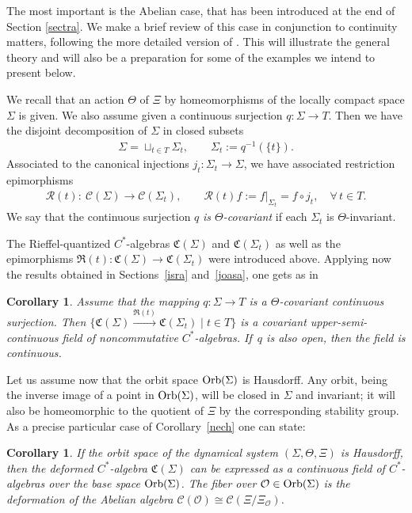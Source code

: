 \documentclass[pdftex]{sigma}
\def\Th{\Theta}
\def\C{\mathcal{C}}
\def\R{\mathcal{R}}
\def\CC{{\mathfrak C}}
\def\RR{{\mathfrak R}}
\def\Si{\Sigma}
\providecommand{\CC}{\mathfrak{C}}
\newtheorem{Corollary}[Theorem]{Corollary}
\begin{document}
The most important is the Abelian case, that has been introduced at the end of Section \ref{sectra}.
We make a brief review of this case in conjunction to continuity matters, following the more detailed version of \cite[Section~2]{BM}. This will illustrate the general theory and will also be a preparation for some of the examples we intend to present below.

We recall that an action $\Th$ of $\Xi$ by homeomorphisms of the locally compact space $\Si$ is given. We also assume given a continuous surjection $q:\Sigma\to T$. Then we have the disjoint decomposition of $\Si$ in closed subsets
\begin{gather*}%
\Si=\sqcup_{t\in T}\Si_t,\qquad \Si_t:=q^{-1}(\{t\}).
\end{gather*}
Associated to the canonical injections $j_t:\Si_t\to\Si$, we have associated restriction epimorphisms
\begin{gather*}%
\R(t): \ \C(\Si)\to\C(\Si_t),\qquad \R(t)f:=f|_{\Si_t}=f\circ j_t,\quad \forall\, t\in T.
\end{gather*}
We say that the continuous surjection $q$ {\it is $\Th$-covariant} if each $\Si_t$ is $\Theta$-invariant.

The Rief\/fel-quantized $C^*$-algebras $\CC(\Si)$ and $\CC(\Si_t)$ as well as the epimorphisms
$\mathfrak R(t):\CC(\Si)\rightarrow\CC(\Si_t)$ were introduced above.
Applying now the results obtained in Sections~\ref{isra} and~\ref{joasa}, one gets as in \cite[Section~2]{BM}

\begin{Corollary}\label{cfild}
Assume that the mapping $q:\Si\rightarrow T$ is a $\Th$-covariant continuous surjection.
Then $\big\{\CC(\Si)\overset{\RR(t)}{\longrightarrow}\CC(\Si_t)\mid  t\in T\big\}$ is a covariant
upper-semi-continuous field of noncommutative $C^*$-algebras.
If~$q$ is also open, then the field is continuous.
\end{Corollary}

Let us assume now that the orbit space ${\rm Orb}(\Si)$ is Hausdorf\/f.
Any orbit, being the inverse image of a point in ${\rm Orb}(\Si)$, will be closed in
$\Si$ and invariant; it will also be homeomorphic to the quotient of $\Xi$ by the corresponding
stability group. As a precise particular case of Corollary~\ref{nech} one can state:

\begin{Corollary}\label{neluz}
If the orbit space of the dynamical system
$(\Si,\Th,\Xi)$ is Hausdorff, then the deformed $C^*$-algebra $\CC(\Si)$ can be expressed as a continuous field of
$C^*$-algebras over the base space ${\rm Orb}(\Si)$. The fiber over $\mathcal O\in{\rm Orb}(\Si)$ is the deformation
of the Abelian algebra $\C(\mathcal O)\cong\C(\Xi/\Xi_\mathcal O)$.
\end{Corollary}
\end{document}
